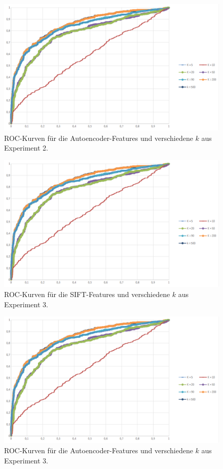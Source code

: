 \begin{figure}
	\centering
	\includegraphics[scale=0.7]{images/roc_ph.png}
	\caption{ROC-Kurven für die Autoencoder-Features und verschiedene $k$ aus Experiment 2.}
	\label{img:roc4}
\end{figure}

\begin{figure}
	\centering
	\includegraphics[scale=0.7]{images/roc_ph.png}
	\caption{ROC-Kurven für die SIFT-Features und verschiedene $k$ aus Experiment 3.}
	\label{img:roc5}
\end{figure}

\begin{figure}
	\centering
    \includegraphics[scale=0.7]{images/roc_ph.png}
    \caption{ROC-Kurven für die Autoencoder-Features und verschiedene $k$ aus Experiment 3.}
    \label{img:roc6}
\end{figure}


